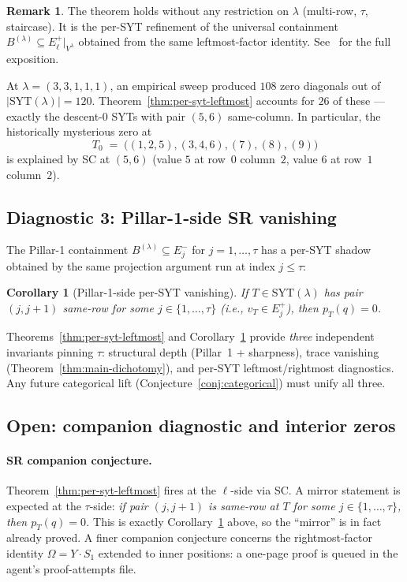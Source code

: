 \documentclass[11pt]{article}
\newtheorem{corollary}[theorem]{Corollary}
\theoremstyle{definition}
\newtheorem{remark}[theorem]{Remark}
\newcommand{\Vlam}{V^{\lambda}}
\newcommand{\Om}{\Omega}
\newcommand{\SYT}{\mathrm{SYT}}
\newcommand{\Eplus}{E^{+}}
\newcommand{\Eminus}{E^{-}}
\begin{document}
\begin{remark}
The theorem holds without any restriction on $\lambda$ (multi-row, $\tau$,
staircase).  It is the per-SYT refinement of the universal containment
$B^{(\lambda)} \subseteq \Eplus_\ell|_{\Vlam}$ obtained from the same
leftmost-factor identity.  See~\cite{leftmostPerSYT} for the full
exposition.
\end{remark}

At $\lambda = (3,3,1,1,1)$, an empirical sweep produced $108$ zero diagonals
out of $|\SYT(\lambda)| = 120$.  Theorem~\ref{thm:per-syt-leftmost}
accounts for $26$ of these — exactly the descent-$0$ SYTs with pair
$(5, 6)$ same-column.  In particular, the historically mysterious zero at
\[
   T_0 \;=\; \bigl((1,2,5), (3,4,6), (7), (8), (9)\bigr)
\]
is explained by SC at $(5, 6)$ (value $5$ at row~$0$ column~$2$, value $6$ at
row~$1$ column~$2$).

\subsection{Diagnostic 3: Pillar-1-side SR vanishing}\label{sec:diag3}

The Pillar-1 containment $B^{(\lambda)} \subseteq \Eminus_j$ for
$j = 1, \ldots, \tau$ has a per-SYT shadow obtained by the same projection
argument run at index $j \le \tau$:

\begin{corollary}[Pillar-1-side per-SYT vanishing]\label{cor:pillar1-side-survey}
If $T \in \SYT(\lambda)$ has pair $(j, j+1)$ same-row for some
$j \in \{1, \ldots, \tau\}$ (i.e., $v_T \in \Eplus_j$), then $p_T(q) = 0$.
\end{corollary}

Theorems~\ref{thm:per-syt-leftmost} and Corollary~\ref{cor:pillar1-side-survey}
provide \emph{three} independent invariants pinning $\tau$: structural
depth (Pillar~1 + sharpness), trace vanishing (Theorem~\ref{thm:main-dichotomy}),
and per-SYT leftmost/rightmost diagnostics.  Any future categorical lift
(Conjecture~\ref{conj:categorical}) must unify all three.

\subsection{Open: companion diagnostic and interior zeros}\label{sec:diag-open}

\paragraph{SR companion conjecture.}
Theorem~\ref{thm:per-syt-leftmost} fires at the $\ell$-side via SC.  A
mirror statement is expected at the $\tau$-side: \emph{if pair $(j, j+1)$
is same-row at $T$ for some $j \in \{1, \ldots, \tau\}$, then $p_T(q) = 0$.}
This is exactly Corollary~\ref{cor:pillar1-side-survey} above, so the
``mirror'' is in fact already proved.  A finer companion conjecture
concerns the rightmost-factor identity $\Om = Y \cdot S_1$ extended to
inner positions: a one-page proof is queued in the agent's
proof-attempts file.
\end{document}
